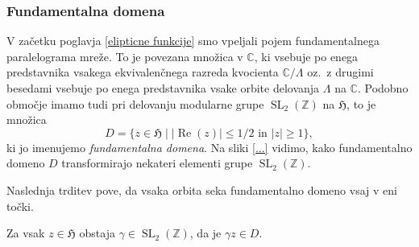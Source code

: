 \documentclass[mat1]{fmfdelo}
\numberwithin{equation}{section}
\newcommand{\Z}{\mathbb Z}
\newcommand{\C}{\mathbb C}
\newcommand{\HH}{\mathfrak{H}}
\newcommand{\torus}{\C/\Lambda}
\newcommand{\SL}{\operatorname{SL}_2(\Z)}
\newcommand{\abs}[1]{\left\lvert #1 \right\rvert}
\renewcommand\Re{\operatorname{Re}}%
\newcommand{\oz}{oz.\ }
\theoremstyle{definition}
\begin{document}
\subsubsection*{Fundamentalna domena}

V začetku poglavja \ref{elipticne funkcije} smo vpeljali pojem fundamentalnega paralelograma mreže. To je povezana množica v $\C$, ki vsebuje po enega predstavnika vsakega ekvivalenčnega razreda kvocienta $\torus$ \oz z drugimi besedami vsebuje po enega predstavnika vsake orbite delovanja $\Lambda$ na $\C$. Podobno območje imamo tudi pri delovanju modularne grupe $\SL$ na $\HH$, to je množica 
\[
    D = \{z \in \HH \mid \abs{\Re(z)} \leq 1/2 \text{ in } \abs{z} \geq 1\},
\]
ki jo imenujemo \emph{fundamentalna domena}. Na sliki \ref{...} vidimo, kako fundamentalno domeno $D$ transformirajo nekateri elementi grupe $\SL$.

Naslednja trditev pove, da vsaka orbita seka fundamentalno domeno vsaj v eni točki.

\begin{trditev}
    \label{predstavnik fundamentalne domene}
    Za vsak $z \in \HH$ obstaja $\gamma \in \SL$, da je $\gamma z \in D$.
\end{trditev}
\end{document}
